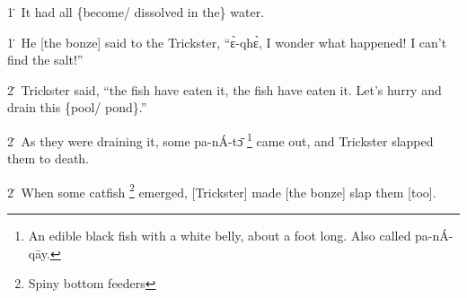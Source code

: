 1\. It had all \{become/ dissolved in the\} water.

1\. He [the bonze] said to the Trickster, ``ɛ̀-qhɛ̀, I wonder what happened!
I can't find the salt!''

2\. Trickster said, ``the fish have eaten it, the fish have eaten it. Let's hurry
and drain this \{pool/ pond\}.''

2\. As they were draining it, some pa-nÁ-tɔ̄ \footnote{An edible black fish with a white belly, about a foot long. Also called pa-nÁ-qāy.} came out, and Trickster slapped
them to death.

2\. When some catfish \footnote{Spiny bottom feeders} emerged, [Trickster] made [the bonze] slap them [too].
